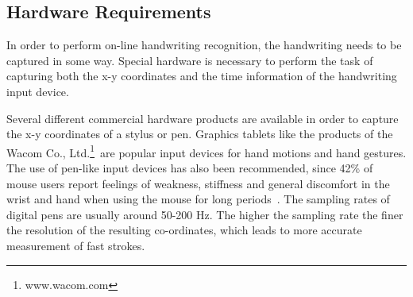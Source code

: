 \subsection{Hardware Requirements}
\label{sec:hardwarerequirements}

In order to perform on-line handwriting recognition, the handwriting needs to 
be captured in some way. Special hardware is necessary to perform the task of
capturing both the x-y coordinates and the time information of the handwriting
input device.

Several different commercial hardware products are available in order to
capture the x-y coordinates of a stylus or pen. Graphics tablets like the
products of the Wacom Co., Ltd.\footnote{www.wacom.com}\ are popular input
devices for hand motions and hand gestures. The use of pen-like input devices 
has also been recommended, since 42\% of mouse users report feelings of 
weakness, stiffness and general discomfort in the wrist and hand when 
using the mouse for long periods~. 
The sampling rates of digital pens are usually around 50-200 Hz. The higher the
sampling rate the finer the resolution of the resulting co-ordinates,
which leads to more accurate measurement of fast strokes. 

